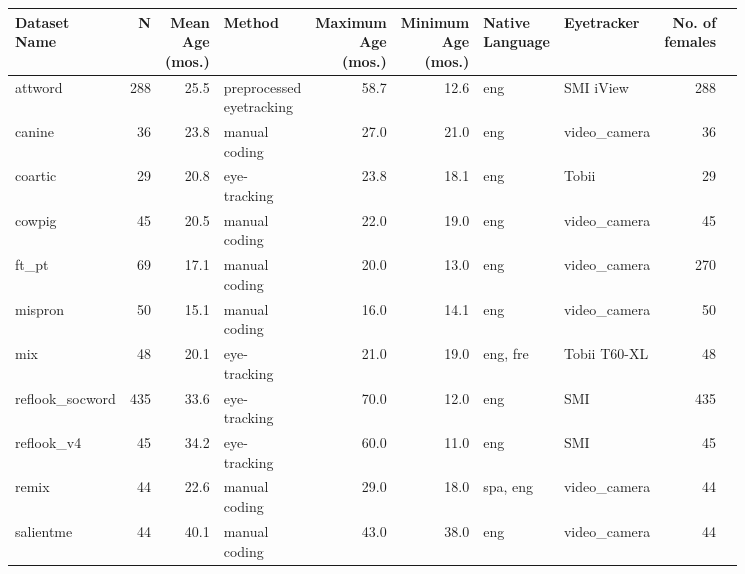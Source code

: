 \documentclass{article}
\begin{document}
\begin{table}[ht!]
\centering
\small
\begin{tabular}{lrrlrrllrr}
  \hline
\thead{Dataset \\ Name} & N & \thead{Mean \\  Age \\ (mos.)} & Method & \thead{ Maximum \\  Age \\ (mos.)} & \thead{Minimum \\ Age \\ (mos.) } & \thead{Native \\ Language} & Eyetracker & \thead{No. of \\ females} \\ 
  \hline
attword & 288 & 25.5 & \thead{preprocessed \\ eyetracking} & 58.7 & 12.6 & eng & SMI iView & 288 \\ 
  canine & 36 & 23.8 & \thead{manual  \\ coding} & 27.0 & 21.0 & eng & video\_camera & 36 \\ 
  coartic & 29 & 20.8 & \thead{eye-\\tracking} & 23.8 & 18.1 & eng & Tobii & 29 \\ 
  cowpig & 45 & 20.5 & \thead{manual  \\ coding} & 22.0 & 19.0 & eng & video\_camera & 45  \\ 
  ft\_pt & 69 & 17.1 & \thead{manual  \\ coding} & 20.0 & 13.0 & eng & video\_camera & 270  \\ 
  mispron & 50 & 15.1 & \thead{manual  \\ coding} & 16.0 & 14.1 & eng & video\_camera & 50 \\ 
  mix & 48 & 20.1 & \thead{eye-\\tracking}  & 21.0 & 19.0 & eng, fre & Tobii T60-XL & 48 \\ 
  reflook\_socword & 435 & 33.6 & \thead{eye-\\tracking}  & 70.0 & 12.0 & eng & SMI & 435  \\ 
  reflook\_v4 & 45 & 34.2 & \thead{eye-\\tracking}  & 60.0 & 11.0 & eng & SMI & 45 \\ 
  remix & 44 & 22.6 & \thead{manual  \\ coding} & 29.0 & 18.0 & spa, eng & video\_camera & 44 \\ 
  salientme & 44 & 40.1 & \thead{manual  \\ coding} & 43.0 & 38.0 & eng & video\_camera & 44 \\ 

\end{tabular}
\end{table}
\end{document}
